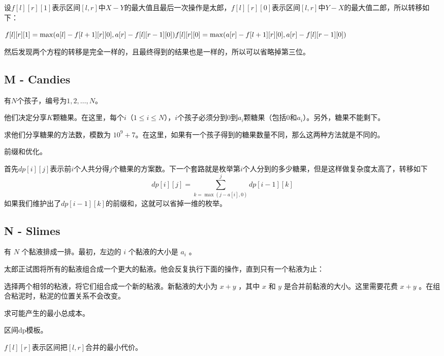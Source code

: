 设$f[l][r][1]$表示区间$[l,r]$中$X-Y$的最大值且最后一次操作是太郎，$f[l][r][0]$表示区间$[l,r]$中$Y-X$的最大值二郎，所以转移如下：

$
f[l][r][1] = \max( a[l] - f[l+1][r][0] , a[r] - f[l][r-1][0])

\\f[l][r][0] = \max( a[r] - f[l+1][r][0] , a[r] - f[l][r-1][0])
$

然后发现两个方程的转移是完全一样的，且最终得到的结果也是一样的，所以可以省略掉第三位。



\subsection{M - Candies}
\begin{framed}
    有$N$个孩子，编号为$1, 2, \ldots, N$。

    他们决定分享$K$颗糖果。在这里，每个$i$（$1 \leq i \leq N$），$i$个孩子必须分到$0$到$a_i$颗糖果（包括$0$和$a_i$）。另外，糖果不能剩下。

    求他们分享糖果的方法数，模数为 $10^9 + 7$。在这里，如果有一个孩子得到的糖果数量不同，那么这两种方法就是不同的。
\end{framed}
前缀和优化。

首先$dp[i][j]$表示前$i$个人共分得$j$个糖果的方案数。下一个套路就是枚举第$i$个人分到的多少糖果，但是这样做复杂度太高了，转移如下
$$
dp[i][j] = \sum_{k=\max(j-a[i],0)}^{j} dp[i-1][k]
$$
如果我们维护出了$dp[i-1][k]$的前缀和，这就可以省掉一维的枚举。


\subsection{N - Slimes}
\begin{framed}
    有 $N$ 个黏液排成一排。最初，左边的 $i$ 个黏液的大小是 $a_i$ 。

    太郎正试图将所有的黏液组合成一个更大的黏液。他会反复执行下面的操作，直到只有一个粘液为止：

    选择两个相邻的粘液，将它们组合成一个新的粘液。新黏液的大小为 $x + y$ ，其中 $x$ 和 $y$ 是合并前黏液的大小。这里需要花费 $x + y$ 。在组合粘泥时，粘泥的位置关系不会改变。

    求可能产生的最小总成本。
\end{framed}
区间dp模板。

$f[l][r]$表示区间把$[l,r]$合并的最小代价。

